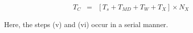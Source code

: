 \documentclass{rspublic}
\newcommand{\jhanote}[1]{ {\textcolor{red} { ***shantenu: #1 }}}
\newcommand{\alnote}[1]{ {\textcolor{blue} { ***andre: #1 }}}
\newcommand{\athotanote}[1]{ {\textcolor{green} { ***athota: #1 }}}
\newcommand{\alnote}[1]{}
\newcommand{\athotanote}[1]{}
\newcommand{\jhanote}[1]{}
\begin{document}

\begin{eqnarray}
T_{C} &=& [T_{s}+T_{MD} + T_{W} + T_{X}] \times N_{X}
\label{eq:equation 1}
\end{eqnarray}

Here, the steps (v) and (vi) occur in a serial manner.
 
\end{document}
